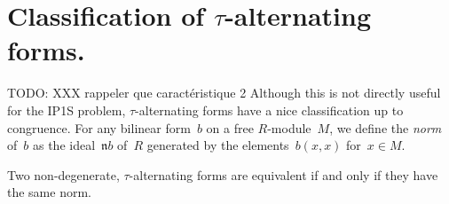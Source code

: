 \documentclass{lms}
\def\todo#1{{\color{orange}TODO: #1}}
\let\fr\mathfrak
\begin{document}
\section{Classification of $τ$-alternating forms.}

\todo{XXX rappeler que caractéristique 2}
Although this is not directly useful for the IP1S problem,
$τ$-alternating forms have a nice classification up to congruence.
For any bilinear form~$b$ on a free $R$-module~$M$, we define the
\emph{norm} of~$b$ as the ideal~$\fr{n} b$ of~$R$
generated by the elements~$b(x, x)$ for~$x ∈ M$.

\begin{prop}\label{prop:eqv-norm}
Two non-degenerate, $τ$-alternating forms are equivalent if and only
if they have the same norm.
\end{prop}
\end{document}
